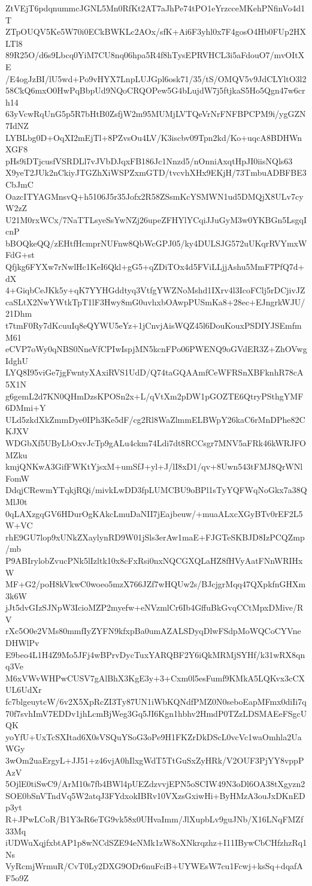 ZtVEjT6pdqnummcJGNL5Mn0RfKt2AT7aJhPe74tPO1eYrzcceMKehPNfinVo4d1T
ZTpOUQV5Ke5W70i0ECkBWKLc2AOx/sfK+Ai6F3yhl0x7F4gosO4Hb0FUp2HXLTl8
89R25O/d6s9Lbcq0YiM7CU8nq06hpa5R4f8hTysEPRVHCL3i5aFdouO7/mvOItXE
/E4ogJzBI/lU5wd+Po9vHYX7LnpLUJGpl6osk71/35/tS/OMQV5v9JdCLYltO3l2
58CkQ6mxO0HwPqBbpUd9NQoCRQOPew5G4bLujdW7j5ftjkaS5Ho5Qgn47w6crh14
63yVcwRqUnG5p5R7bHtB0ZsfjW2m95MUMjLVTQeVrNrFNFBPCPM9i/ygGZN7IdNZ
LYBLbg0D+OqXI2mEjTl+8PZvsOu4LV/K3iscbv09Tpn2kd/Ko+uqcA8BDHWnXGF8
pHs9iDTjcusfVSRDLl7vJVbDJqxFB186Jc1Nnzd5/nOnniAxqtHpJI0iisNQls63
X9yeT2JUk2nCkiyJTGZhXiWSPZxmGTD/tvcvhXHx9EKjH/73TmbuADBFBE3CbJmC
OazcITYAGMnsvQ+h5106J5r35Jofx2R58ZSsmKcYSMWN1ud5DMQjX8ULv7cyW2zZ
U21M0rxWCx/7NaTTLsyeSsYwNZj26upeZFHYlYCqiJJuGyM3w0YKBGn5LsgqIcnP
bBOQkeQQ/zEHtfHcmprNUFnw8QbWcGPJ05/ky4DULSJG572uUKqrRVYmxWFdG+st
Qfjkg6FYXw7rNwlHc1KeI6Qkl+gG5+qZDiTOx4d5FViLLjjAshu5MmF7PfQ7d+dX
4+GiqbCeJKk5y+qK7YYHGddtyq3VtfgYWZNoMshd1IXrv4l3IcoFClj5rDCjivJZ
caSLtX2NwYWtkTpT1lF3Hwy8mG0uvhxbOAwpPUSmKa8+28ec+EJngrkWJU/21Dhm
t7tmF0Ry7dKcuuIq8eQYWU5eYz+1jCnvjAisWQZ45l6DouKouxPSDIYJSEmfmM61
eCVP7oWy0qNBS0NneVfCPIwIspjMN5kcnFPo06PWENQ9oGVdER3Z+ZhOVwgIdghU
LYQ8I95viGe7jgFwntyXAxiRVS1UdD/Q74taGQAAmfCeWFRSnXBFknhR78cA5X1N
g6gemL2d7KN0QHmDzsKPOSn2x+L/qVtXm2pDW1pGOZTE6QtryPSthgYMF6DMmi+Y
ULd5zkdXkZmmDye0IPh3Ke5dF/cg2Rl8WaZlmmELBWpY26kaC6rMnDPhe82CKJXV
WDGbXf5UByLbOxvJcTp9gALu4ckm74Ldi7dt8RCCsgr7MNV5aFRk46kWRJFOMZku
kmjQNKwA3GifFWKtYjsxM+umSfJ+yl+J/lI8xD1/qv+8Uwn543tFMJ8QrWNlFomW
DdqjCRewmYTqkjRQi/mivkLwDD3fpLUMCBU9oBPl1sTyYQFWqNoGkx7a38QMlJ0t
0qLAXzgqGV6HDurOgKAkcLmuDaNII7jEajbeuw/+muaALxcXGyBTv0rEF2L5W+VC
rhE9GU7lop9xUNkZXaylynRD9W01jSls3erAw1maE+FJGTeSKBJD8IzPCQZmp/mb
P9ABIrylobZvucPNk5lIzltk10x8cFxRsi0nxNQCGXQLaHZ8fHVyAatFNnWRIHxW
MF+G2/poH8kVkwC0woeo5mzX766JZf7wHQUw2s/BJcjgrMqq47QXpkfnGHXm3k6W
jJt5dvGIzSJNpW3IcioMZP2myefw+eNVzmlCr6Ib4GffuBkGvqCCtMpxDMive/RV
rXc5O0e2VMs80mmfIyZYFN9kfxpBa0umAZALSDyqDlwFSdpMoWQCoCYVneDHWlPv
E9beo4L1H4Z9Mo5JFj4wBPrvDycTuxYARQBF2Y6iQkMRMjSYHf/k31wRX8qnq3Ve
M6xVWvWHPwCUSV7gAlBhX3KgE3y+3+Cxm0l5esFumf9KMkA5LQKvx3cCXUL6UdXr
fc7blgeuytcW/6v2X5XpRcZI3Ty87UN1iWbKQNdfPMZ0N0seboEapMFmx0diIi7q
70f7svhImV7EDDv1jhLcmBjWeg3Gq5JI6Kgn1hbhv2HmdP0TZzLDSMAEeFSgcUQK
yoYfU+UxTcSXItad6X0sVSQuYSoG3oPe9H1FKZrDkDScL0vcVc1waOmhla2UaWGy
3wOm2uaErgyL+JJ51+z46vjA0hIlxgWdT5TtGuSxZyHRk/V2OUF3PjYY8vppPAzV
5OjlE0tiSwC9/ArM10s7fb4BWl4pUEZdzvvjEPN5oSCIW49N3oDl6OA38tXgyzn2
SOE0bSnVTndVq5W2atqJ3FYdxokIBRv10VXzsGxiwHi+ByHMzA3ouJxDKnEDp3yt
R+JPwLCoR/B1Y3sR6eTG9vk58x0UHvaImm/JlXupbLv9guJNb/X16LNqFMZf33Mq
iUDWuXqjfxbtAP1p8wNCdSZE94eNMk1zW8oXNkrqzhz+I11IBywCbCHfzhzRq1Ns
VyRcmjWrmuR/CvT0Ly2DXG9ODr6nuFciB+UYWEsW7cu1Fcwj+ksSq+dqafAF5o9Z
